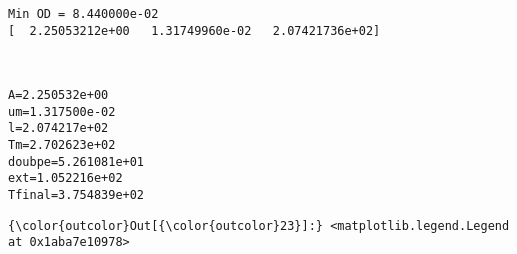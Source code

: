 \documentclass[11pt]{article}
\begin{document}
    \begin{Verbatim}[commandchars=\\\{\}]
Min OD = 8.440000e-02
[  2.25053212e+00   1.31749960e-02   2.07421736e+02]

    \end{Verbatim}

    \begin{center}
    \end{center}
    { \hspace*{\fill} \\}
    
    \begin{Verbatim}[commandchars=\\\{\}]
A=2.250532e+00
um=1.317500e-02
l=2.074217e+02
Tm=2.702623e+02
doubpe=5.261081e+01
ext=1.052216e+02
Tfinal=3.754839e+02

    \end{Verbatim}

            \begin{Verbatim}[commandchars=\\\{\}]
{\color{outcolor}Out[{\color{outcolor}23}]:} <matplotlib.legend.Legend at 0x1aba7e10978>
\end{Verbatim}
        
    \begin{center}
    \end{center}
    { \hspace*{\fill} \\}
    
    \begin{center}
    \end{center}
    { \hspace*{\fill} \\}
    
\end{document}
